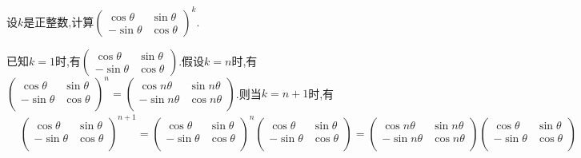 \documentclass[../../main.tex]{subfiles}%
\begin{document}
\begin{example}
设\(k\)是正整数,计算\(\begin{pmatrix}
\cos\theta & \sin\theta\\
-\sin\theta & \cos\theta
\end{pmatrix}^k\).
\end{example}
\begin{solution}

已知$k=1$时,有\(\begin{pmatrix}
\cos\theta & \sin\theta\\
-\sin\theta & \cos\theta
\end{pmatrix}\).假设$k=n$时,有$\left( \begin{matrix}
\cos \theta&		\sin \theta\\
-\sin \theta&		\cos \theta\\
\end{matrix} \right) ^n=\left( \begin{matrix}
\cos n\theta&		\sin n\theta\\
-\sin n\theta&		\cos n\theta\\
\end{matrix} \right) $.则当$k=n+1$时,有
\begin{align*}
&\left( \begin{matrix}
\cos \theta&		\sin \theta\\
-\sin \theta&		\cos \theta\\
\end{matrix} \right) ^{n+1}=\left( \begin{matrix}
\cos \theta&		\sin \theta\\
-\sin \theta&		\cos \theta\\
\end{matrix} \right) ^n\left( \begin{matrix}
\cos \theta&		\sin \theta\\
-\sin \theta&		\cos \theta\\
\end{matrix} \right) =\left( \begin{matrix}
\cos n\theta&		\sin n\theta\\
-\sin n\theta&		\cos n\theta\\
\end{matrix} \right) \left( \begin{matrix}
\cos \theta&		\sin \theta\\
-\sin \theta&		\cos \theta\\
\end{matrix} \right) 
\\

\end{align*}
\end{solution}
\end{document}
